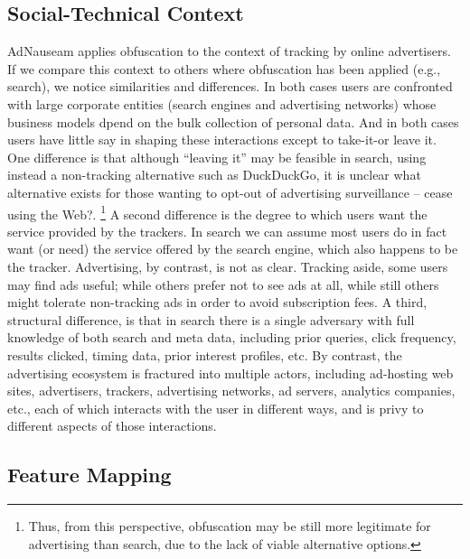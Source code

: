 \documentclass[conference]{IEEEtran}
\begin{document}
\subsection{Social-Technical Context}

AdNauseam applies obfuscation to the context of tracking by online advertisers. If we compare this context to others where obfuscation has been applied (e.g., search), we notice similarities and differences. In both cases users are confronted with large corporate entities (search engines and advertising networks) whose business models dpend on the bulk collection of personal data. And in both cases users have little say in shaping these interactions except to take-it-or leave it. One difference is that although “leaving it” may be feasible in search, using instead a non-tracking alternative such as DuckDuckGo, it is unclear what alternative exists for those wanting to opt-out of advertising surveillance – cease using the Web?. \footnote{Thus, from this perspective, obfuscation may be still more legitimate for advertising than search, due to the lack of viable alternative options.} A second difference is the degree to which users want the service provided by the trackers. In search we can assume most users do in fact want (or need) the service offered by the search engine, which also happens to be the tracker. Advertising, by contrast, is not as clear. Tracking aside, some users may find ads useful; while others prefer not to see ads at all, while still others might tolerate non-tracking ads in order to avoid subscription fees. A third, structural difference, is that in search there is a single adversary with full knowledge of both search and meta data, including prior queries, click frequency, results clicked, timing data, prior interest profiles, etc. By contrast, the advertising ecosystem is fractured into multiple actors, including ad-hosting web sites, advertisers, trackers, advertising networks, ad servers, analytics companies, etc., each of which interacts with the user in different ways, and is privy to different aspects of those interactions.

\subsection{Feature Mapping}
\end{document}
